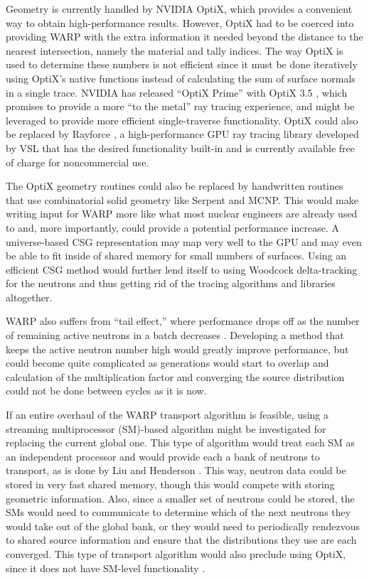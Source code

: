 \documentclass[preprint,12pt]{elsarticle}
\begin{document}
Geometry is currently handled by NVIDIA OptiX, which provides a convenient way to obtain high-performance results. However, OptiX had to be coerced into providing WARP with the extra information it needed beyond the distance to the nearest intersection, namely the material and tally indices.  The way OptiX is used to determine these numbers is not efficient since it must be done iteratively using OptiX's native functions instead of calculating the sum of surface normals in a single trace.  NVIDIA has released ``OptiX Prime'' with OptiX 3.5 \cite{optix3.5}, which promises to provide a more ``to the metal'' ray tracing experience, and might be leveraged to provide more efficient single-traverse functionality.  OptiX could also be replaced by Rayforce \cite{rayforce}, a high-performance GPU ray tracing library developed by VSL that has the desired functionality built-in and is currently available free of charge for noncommercial use.

The OptiX geometry routines could also be replaced by handwritten routines that use combinatorial solid geometry like Serpent and MCNP.  This would make writing input for WARP more like what most nuclear engineers are already used to and, more importantly, could provide a potential performance increase.  A universe-based CSG representation may map very well to the GPU and may even be able to fit inside of shared memory for small numbers of surfaces.  Using an efficient CSG method would further lend itself to using Woodcock delta-tracking for the neutrons and thus getting rid of the tracing algorithms and libraries altogether.   

WARP also suffers from ``tail effect,'' where performance drops off as the number of remaining active neutrons in a batch decreases \cite{algorithms}.  Developing a method that keeps the active neutron number high would greatly improve performance, but could become quite complicated as generations would start to overlap and calculation of the multiplication factor and converging the source distribution could not be done between cycles as it is now.  

If an entire overhaul of the WARP transport algorithm is feasible, using a streaming multiprocessor (SM)-based algorithm might be investigated for replacing the current global one.  This type of algorithm would treat each SM as an independent processor and would provide each a bank of neutrons to transport, as is done by Liu and Henderson \cite{tianyu,henderson}.   This way, neutron data could be stored in very fast shared memory, though this would compete with storing geometric information.  Also, since a smaller set of neutrons could be stored, the SMs would need to communicate to determine which of the next neutrons they would take out of the global bank, or they would need to periodically rendezvous to shared source information and ensure that the distributions they use are each converged.  This type of transport algorithm would also preclude using OptiX, since it does not have SM-level functionality \cite{optix}.
\end{document}
